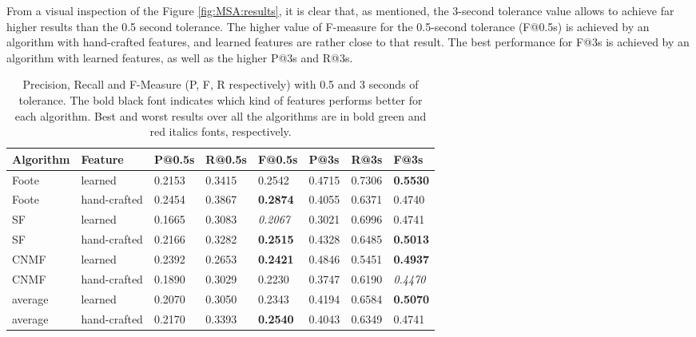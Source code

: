 From a visual inspection of the  Figure \ref{fig:MSA:results}, it is clear that, as mentioned, the 3-second tolerance value allows to achieve far higher results than the 0.5 second tolerance. The higher value of F-measure for the 0.5-second tolerance (F@0.5s) is achieved by an algorithm with hand-crafted features, and learned features are rather close to that result. The best performance for F@3s is achieved by an algorithm with learned features, as well as the higher P@3s and R@3s.

 \begin{table}[tb]
 \centering
 \caption{Precision, Recall and F-Measure (P, F, R respectively)  with 0.5 and 3 seconds of tolerance. The bold black font indicates which kind of features performs better for each algorithm.
 	Best and worst results over all the algorithms are in bold green and red italics fonts, respectively.}
 \label{tab:MSA:results}
 \bgroup
 \def\arraystretch{1.5}
 \begin{tabular}{||l|l|lll|lll||}
 \hline
  \hline
 Algorithm & Feature    & P@0.5s    & R@0.5s    & F@0.5s     & P@3s     & R@3s     & F@3s   \\
 \hline
  \hline
 Foote & learned         & 0.2153 & 0.3415 & 0.2542 & 0.4715 & 0.7306 & {\color[HTML]{326B00}\textbf{0.5530} } \\
 Foote  & hand-crafted & 0.2454 & 0.3867 & {\color[HTML]{326B00} \textbf{0.2874}} & 0.4055 & 0.6371 & 0.4740  \\
\hline
 SF        & learned         & 0.1665 & 0.3083 & 
{\color[HTML]{8E0000} \textit{0.2067}} & 0.3021 & 0.6996 & 0.4741 \\
SF & hand-crafted & 0.2166 & 0.3282 & \textbf{0.2515} & 0.4328 & 0.6485 & 
\textbf{0.5013} \\
 \hline
CNMF      & learned         & 0.2392 & 0.2653 & \textbf{0.2421} & 0.4846 & 0.5451 & \textbf{0.4937} \\
CNMF & hand-crafted & 0.1890 & 0.3029 & 0.2230 & 0.3747 & 0.6190 & 
{\color[HTML]{8E0000} \textit{0.4470}} \\
\hline
average      & learned         &  0.2070 &  0.3050&  0.2343 &  0.4194    & 0.6584& \textbf{0.5070} \\
average & hand-crafted & 0.2170  &  0.3393&  \textbf{0.2540} &  0.4043& 0.6349& 0.4741  \\
         \hline
         \hline
 \end{tabular}
 \egroup
 \end{table}

